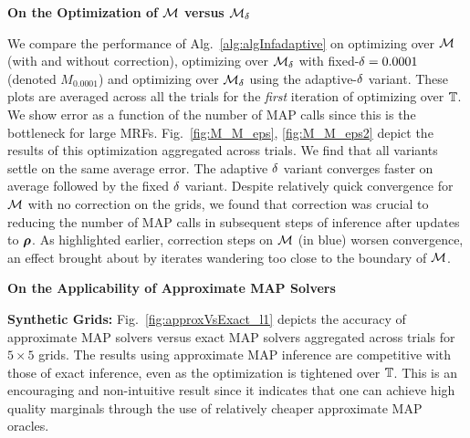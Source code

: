 %
\newpage
		\centerline{\textbf{On the Optimization of $\mathcal{M}$ versus $\mathcal{M}_{\delta}$\label{sec:M_M_eps}}}
We compare the performance of Alg.~\ref{alg:algInfadaptive} on optimizing over $\mathcal{M}$ (with and without correction), optimizing 
over $\mathcal{M}_{\delta}$ with fixed-$\delta = 0.0001$ (denoted $M_{0.0001}$) and optimizing over $\mathcal{M}_{\delta}$ using the adaptive-$\delta$ variant.
These plots are averaged across all the trials for the \emph{first} iteration of optimizing over $\mathbb{T}$.
We show error as a function of the number of MAP calls since this is the bottleneck
for large MRFs. 
Fig.~\ref{fig:M_M_eps}, \ref{fig:M_M_eps2} depict the results of this optimization aggregated across trials. 
We find that all
variants settle on the same average error. The adaptive $\delta$ variant converges faster on average
followed by the fixed $\delta$ variant. Despite relatively quick convergence for
$\mathcal{M}$ with no correction on the grids, we found that correction was crucial
to reducing the
%
%
number of MAP calls in subsequent steps of inference after updates to $\bm{\rho}$. %
As highlighted earlier, correction steps on $\mathcal{M}$ (in blue) worsen 
convergence, an effect brought about by iterates wandering too close to the boundary of $\mathcal{M}$.

%
%

\vspace{2mm}
\centerline{\textbf{On the Applicability of Approximate MAP Solvers}}

\textbf{Synthetic Grids:}
Fig.~\ref{fig:approxVsExact_l1} depicts the accuracy of approximate MAP 
solvers versus exact MAP solvers aggregated across trials for $5\times5$ grids.
The results using approximate MAP inference are competitive with those of exact
inference, even as the optimization is tightened over $\mathbb{T}$. 
This is an encouraging and non-intuitive result
since it indicates that one can achieve high quality marginals through
the use of relatively cheaper approximate MAP oracles.%

